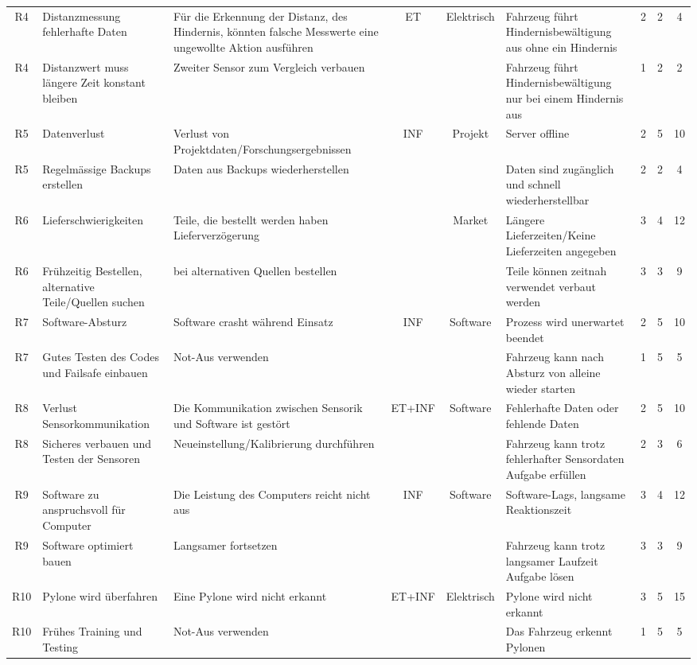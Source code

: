 \documentclass[../main.tex]{subfiles}
\makeatletter
\def\nbhline{%
\noalign{%
  \global\let\tmp\@lowpenalty
  \gdef\@lowpenalty{-10000 }}%
\hline
\noalign{\global\let\@lowpenalty\tmp}}
\makeatother
\begin{document}
\begin{landscape}
\begin{longtable}{|c|p{4cm}|p{4cm}|c|c|p{4cm}|c|c|c|}
\rowcolor{white} R4 & Distanzmessung fehlerhafte Daten & Für die Erkennung der Distanz, des Hindernis, könnten falsche Messwerte eine ungewollte Aktion ausführen & ET & Elektrisch & Fahrzeug führt Hindernisbewältigung aus ohne ein Hindernis & 2 & 2 & 4 \\ \nbhline
\rowcolor{white} R4 & Distanzwert muss längere Zeit konstant bleiben & Zweiter Sensor zum Vergleich verbauen & & & Fahrzeug führt Hindernisbewältigung nur bei einem Hindernis aus & 1 & 2 & 2 \\ \hline

\rowcolor[HTML]{F5F5F5} R5 & Datenverlust & Verlust von Projektdaten/Forschungsergebnissen & INF & Projekt & Server offline & 2 & 5 & 10 \\ \nbhline
\rowcolor[HTML]{F5F5F5} R5 & Regelmässige Backups erstellen & Daten aus Backups wiederherstellen & & & Daten sind zugänglich und schnell wiederherstellbar & 2 & 2 & 4 \\ \hline

\rowcolor{white} R6 & Lieferschwierigkeiten & Teile, die bestellt werden haben Lieferverzögerung & &  Market & Längere Lieferzeiten/Keine Lieferzeiten angegeben & 3 & 4 & 12 \\ \nbhline
\rowcolor{white} R6 & Frühzeitig Bestellen, alternative Teile/Quellen suchen & bei alternativen Quellen bestellen & & & Teile können zeitnah verwendet verbaut werden & 3 & 3 & 9 \\ \hline

\rowcolor[HTML]{F5F5F5} R7 & Software-Absturz & Software crasht während Einsatz & INF & Software & Prozess wird unerwartet beendet & 2 & 5 & 10 \\ \nbhline
\rowcolor[HTML]{F5F5F5} R7 & Gutes Testen des Codes und Failsafe einbauen & Not-Aus verwenden & & & Fahrzeug kann nach Absturz von alleine wieder starten & 1 & 5 & 5 \\
\hline
\rowcolor{white} R8 & Verlust Sensorkommunikation & Die Kommunikation zwischen Sensorik und Software ist gestört & ET+INF & Software & Fehlerhafte Daten oder fehlende Daten & 2 & 5 & 10 \\ \nbhline
\rowcolor{white} R8 & Sicheres verbauen und Testen der Sensoren & Neueinstellung/Kalibrierung durchführen & & & Fahrzeug kann trotz fehlerhafter Sensordaten Aufgabe erfüllen & 2 & 3 & 6 \\ \hline

\rowcolor[HTML]{F5F5F5} R9 & Software zu anspruchsvoll für Computer & Die Leistung des Computers reicht nicht aus & INF & Software & Software-Lags, langsame Reaktionszeit & 3 & 4 & 12 \\ \nbhline
\rowcolor[HTML]{F5F5F5} R9 & Software optimiert bauen & Langsamer fortsetzen & & & Fahrzeug kann trotz langsamer Laufzeit Aufgabe lösen & 3 & 3 & 9 \\
\hline
\rowcolor{white} R10 & Pylone wird überfahren & Eine Pylone wird nicht erkannt & ET+INF & Elektrisch & Pylone wird nicht erkannt & 3 & 5 & 15 \\ \nbhline
\rowcolor{white} R10 & Frühes Training und Testing & Not-Aus verwenden & & & Das Fahrzeug erkennt Pylonen & 1 & 5 & 5 \\ \hline


\end{longtable}
\end{landscape}
\end{document}
